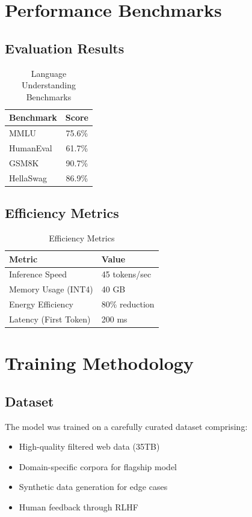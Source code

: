 \documentclass[11pt,a4paper]{article}
\begin{document}
\section{Performance Benchmarks}

\subsection{Evaluation Results}

\begin{table}[H]
\centering
\begin{tabular}{lc}
\toprule
\textbf{Benchmark} & \textbf{Score} \\
\midrule
MMLU & 75.6\% \\
HumanEval & 61.7\% \\
GSM8K & 90.7\% \\
HellaSwag & 86.9\% \\
\bottomrule
\end{tabular}
\caption{Language Understanding Benchmarks}
\end{table}

\subsection{Efficiency Metrics}

\begin{table}[H]
\centering
\begin{tabular}{ll}
\toprule
\textbf{Metric} & \textbf{Value} \\
\midrule
Inference Speed & 45 tokens/sec \\
Memory Usage (INT4) & 40 GB \\
Energy Efficiency & 80\% reduction \\
Latency (First Token) & 200 ms \\
\bottomrule
\end{tabular}
\caption{Efficiency Metrics}
\end{table}

\section{Training Methodology}

\subsection{Dataset}
The model was trained on a carefully curated dataset comprising:
\begin{itemize}
    \item High-quality filtered web data (35TB)
    \item Domain-specific corpora for flagship model
    \item Synthetic data generation for edge cases
    \item Human feedback through RLHF
\end{itemize}
\end{document}
